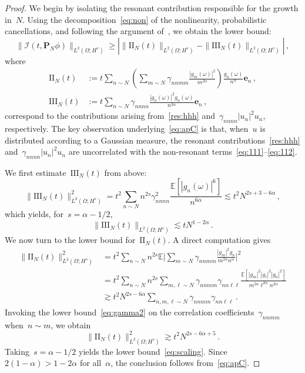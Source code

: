 \documentclass[11pt,reqno,english]{amsart}
\numberwithin{equation}{section}
\theoremstyle{plain}
\theoremstyle{definition}
\theoremstyle{remark}
\begin{document}
\begin{proof}
	We begin by isolating the resonant contribution responsible for the growth in~$N$. Using the decomposition~\eqref{eq:non} of the nonlinearity, probabilistic cancellations, and following the argument of~\cite[Lemma~4.1]{BCLST25}, we obtain the lower bound:
	\begin{equation}
		\label{eq:apC}
		\|\mathcal{I}(t,\mathbf{P}_{N}\phi)\|_{L^{2}(\Omega;H^{s})}
		\geq
		\left|
		\|\mathrm{II}_{N}(t)\|_{L^{2}(\Omega;H^{s})}
		-
		\|\mathrm{III}_{N}(t)\|_{L^{2}(\Omega;H^{s})}
		\right|\,,
	\end{equation}
	where
	\begin{align*}
		\mathrm{II}_{N}(t)&:=t \sum_{n\sim N}
		\left(
		\sum_{m\sim N}\gamma_{nnmm}\frac{|g_{m}(\omega)|^{2}}{m^{2\alpha}}
		\right)
		\frac{g_{n}(\omega)}{n^{\alpha}}\mathbf{e}_{n}\,,
		\\
		\mathrm{III}_{N}(t)&:= t \sum_{n\sim N}\gamma_{nnnn}\frac{|g_{n}(\omega)|^{2}g_{n}(\omega)}{n^{3\alpha}}\mathbf{e}_{n}\,,
	\end{align*}
	correspond to the contributions arising from~\eqref{res:hhh} and~$\gamma_{nnnn}|u_n|^2u_n$, respectively. The key observation underlying~\eqref{eq:apC} is that, when~$u$ is distributed according to a Gaussian measure, the resonant contributions~\eqref{res:hhh} and~$\gamma_{nnnn}|u_n|^2u_n$ are uncorrelated with the non-resonant terms~\eqref{eq:111}--\eqref{eq:112}.

	We first estimate~$\mathrm{III}_{N}(t)$ from above:
	\[
	\|\mathrm{III}_{N}(t)\|_{L^{2}(\Omega;H^{s})}^{2}
	= t^{2}\sum_{n\sim N}n^{2s}\gamma_{nnnn}^{2}\frac{\mathbb{E}[|g_{n}(\omega)|^{6}]}{n^{6\alpha}}
	\lesssim t^{2}N^{2s+3-6\alpha}\,,
	\]
	which yields, for~$s=\alpha-1/2$,
	\[
	\|\mathrm{III}_{N}(t)\|_{L^{2}(\Omega;H^{s})} \lesssim tN^{1-2\alpha}\,.
	\]
	We now turn to the lower bound for~$\mathrm{II}_{N}(t)$. A direct computation gives
	\begin{align*}
		\|\mathrm{II}_{N}(t)\|_{L^{2}(\Omega;H^{s})}^{2}
		&=t^{2}\sum_{n\sim N}n^{2s}
		\mathbb{E}
		\Big|\sum_{m\sim N} \gamma_{nnmm}
		\frac{|g_{m}|^{2}g_{n}}{m^{2\alpha} n^{\alpha}}\Big|^{2}\\
		&=t^{2}\sum_{n\sim N}n^{2s}
		\sum_{m,\ell\sim N} \gamma_{nnmm}\gamma_{nn\ell\ell}
		\frac{\mathbb{E}[|g_{m}|^{2}|g_{\ell}|^{2}|g_{n}|^{2}]}{m^{2\alpha} \ell^{2\alpha} n^{2\alpha}}\\
		&\gtrsim t^{2} N^{2s-6\alpha}\sum_{n,m,\ell\sim N}\gamma_{nnmm}\gamma_{nn\ell\ell}\,.
	\end{align*}
	Invoking the lower bound~\eqref{eq:gamma2} on the correlation coefficients~$\gamma_{nnmm}$ when~$n\sim m$, we obtain
	\[
	\|\mathrm{II}_{N}(t)\|_{L^{2}(\Omega;H^{s})}^{2} \gtrsim t^{2}N^{2s-6\alpha+5}\,.
	\]
	Taking~$s=\alpha-1/2$ yields the lower bound~\eqref{eq:scaling}. Since~$2(1-\alpha)>1-2\alpha$ for all~$\alpha$, the conclusion follows from~\eqref{eq:apC}.
\end{proof}


	
	

	{}
	
	
\end{document}
